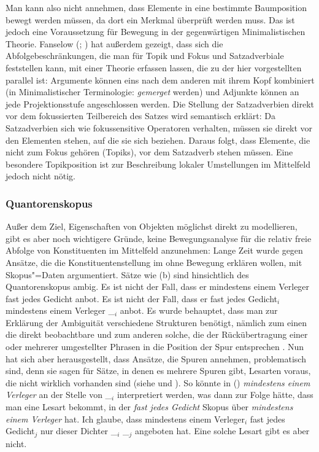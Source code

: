 Man kann also nicht annehmen, dass Elemente in eine bestimmte Baumposition bewegt werden müssen,
da dort ein Merkmal überprüft werden muss. Das ist jedoch eine Voraussetzung für Bewegung in
der gegenwärtigen Minimalistischen Theorie. Fanselow (\citeyear[Abschnitt~4]{Fanselow2003b}; \citeyear[]{Fanselow2006a}) 
hat außerdem gezeigt, dass sich die Abfolgebeschränkungen,
die man für Topik und Fokus und Satzadverbiale
feststellen kann, mit einer Theorie erfassen lassen,
die zu der hier vorgestellten parallel ist: Argumente können eins nach dem anderen mit ihrem Kopf
kombiniert (in Minimalistischer Terminologie: \emph{gemerget} werden) und Adjunkte können an jede
Projektionsstufe angeschlossen werden. Die Stellung der Satzadverbien direkt vor dem fokussierten
Teilbereich des Satzes wird semantisch erklärt: Da Satzadverbien sich wie fokussensitive Operatoren
verhalten, müssen sie direkt vor den Elementen stehen, auf die sie sich beziehen. Daraus folgt,
dass Elemente, die nicht zum Fokus gehören (Topiks), vor dem Satzadverb stehen müssen. Eine besondere
Topikposition ist zur Beschreibung lokaler Umstellungen im Mittelfeld jedoch nicht nötig.
%

\subsubsection{Quantorenskopus}
\label{sec-Scrambling-Skopus}

Außer
dem Ziel, Eigenschaften von Objekten möglichst direkt zu modellieren, gibt es aber noch wichtigere
Gründe, keine Bewegungsanalyse für die relativ freie Abfolge von Konstituenten im Mittelfeld anzunehmen:
Lange Zeit wurde gegen Ansätze, die die Konstituentenstellung im \mf ohne Bewegung erklären wollen,
mit Skopus"=Daten argumentiert. Sätze wie (b) sind hinsichtlich des Quantorenskopus ambig.
\eal
\ex Es ist nicht der Fall, dass er mindestens einem Verleger fast jedes Gedicht anbot.
\ex Es ist nicht der Fall, dass er fast jedes Gedicht$_i$ mindestens einem Verleger \_$_i$ anbot.
\zl
Es wurde behauptet, dass man zur Erklärung der Ambiguität verschiedene Strukturen benötigt, nämlich
zum einen die direkt beobachtbare und zum anderen solche, die der Rückübertragung einer oder
mehrerer umgestellter Phrasen in die Position der Spur entsprechen \citep{Frey93a}.
Nun hat sich aber herausgestellt, dass Ansätze, die Spuren annehmen,
problematisch sind, denn sie sagen für Sätze, in denen es mehrere Spuren gibt, 
Lesarten voraus, die nicht wirklich vorhanden sind (siehe  und ).
So könnte \zb in () \emph{mindestens einem Verleger} an der Stelle von \_$_i$ interpretiert werden,
was dann zur Folge hätte, dass man eine Lesart bekommt, in der
\emph{fast jedes Gedicht} Skopus über \emph{mindestens einem Verleger} hat.
\ea
Ich glaube, dass mindestens einem Verleger$_i$ fast jedes Gedicht$_j$ nur dieser Dichter \_$_i$ \_$_j$ angeboten hat.
\z
Eine solche Lesart gibt es aber nicht.%
%

